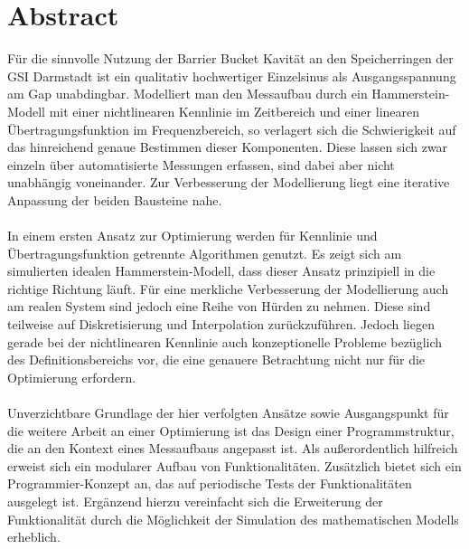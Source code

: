 \documentclass[../Report.tex]{subfiles}
\begin{document}
\chapter*{Abstract}
\label{chap:abstract}

Für die sinnvolle Nutzung der Barrier Bucket Kavität an den Speicherringen der GSI Darmstadt ist ein qualitativ hochwertiger Einzelsinus als Ausgangsspannung am Gap unabdingbar. 
Modelliert man den Messaufbau durch ein Hammerstein-Modell mit einer nichtlinearen Kennlinie im Zeitbereich und einer linearen Übertragungsfunktion im Frequenzbereich, so verlagert sich die Schwierigkeit auf das hinreichend genaue Bestimmen dieser Komponenten.
Diese lassen sich zwar einzeln über automatisierte Messungen erfassen, sind dabei aber nicht unabhängig voneinander. Zur Verbesserung der Modellierung liegt eine iterative Anpassung der beiden Bausteine nahe.
\\
\\
In einem ersten Ansatz zur Optimierung werden für Kennlinie und Übertragungsfunktion getrennte Algorithmen genutzt. Es zeigt sich am simulierten idealen Hammerstein-Modell, dass dieser Ansatz prinzipiell in die richtige Richtung läuft.
Für eine merkliche Verbesserung der Modellierung auch am realen System sind jedoch eine Reihe von Hürden zu nehmen. Diese sind teilweise auf Diskretisierung und Interpolation zurückzuführen. Jedoch liegen gerade bei der nichtlinearen Kennlinie auch konzeptionelle Probleme bezüglich des Definitionsbereichs vor, die eine genauere Betrachtung nicht nur für die Optimierung erfordern.
\\
\\
Unverzichtbare Grundlage der hier verfolgten Ansätze sowie Ausgangspunkt für die weitere Arbeit an einer Optimierung ist das Design einer Programmstruktur, die an den Kontext eines Messaufbaus angepasst ist. Als außerordentlich hilfreich erweist sich ein modularer Aufbau von Funktionalitäten. Zusätzlich bietet sich ein Programmier-Konzept an, das auf periodische Tests der Funktionalitäten ausgelegt ist. Ergänzend hierzu vereinfacht sich die Erweiterung der Funktionalität durch die Möglichkeit der Simulation des mathematischen Modells erheblich.
\end{document}
